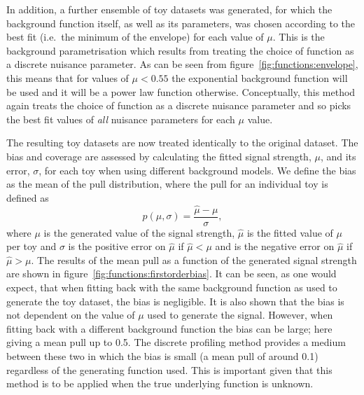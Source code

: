 In addition, a further ensemble of toy datasets was generated, for which the background function itself, as well
as its parameters, was chosen according to the best fit (i.e.~the minimum of the envelope) for each value of $\mu$. This is the background parametrisation which results from treating the choice of function as a discrete nuisance parameter. As can be seen from
figure~\ref{fig:functions:envelope}, this means that for values of $\mu < 0.55$ the exponential background
function will be used and it will be a power law function otherwise.
Conceptually, this method again
treats the choice of function as a discrete nuisance parameter and so picks the
best fit values of {\em all\/} nuisance parameters for each $\mu$ value.

The resulting toy datasets are now treated identically to the original dataset. The bias and coverage are assessed by calculating the fitted signal strength, $\mu$, and its error, $\sigma$, for each toy when using different background models. We define the bias as the mean of the pull distribution, where the pull for an individual toy is defined as
\begin{equation}
	p(\mu,\sigma) = \frac{\hat{\mu}-\mu}{\sigma},
\end{equation}
where $\mu$ is the generated value of the signal strength, $\hat{\mu}$ is the fitted value of $\mu$ per toy and $\sigma$ is the positive error on $\hat{\mu}$ if $\hat{\mu} < \mu$ and is the negative error on $\hat{\mu}$ if $\hat{\mu} > \mu$. The results of the mean pull as a function of the generated signal strength are shown in figure~\ref{fig:functions:firstorderbias}. It can be seen, as one would expect, that when fitting back with the same background function as used to generate the toy dataset, the bias is negligible. It is also shown that the bias is not dependent on the value of $\mu$ used to generate the signal. However, when fitting back with a different background function the bias can be large; here giving a mean pull up to 0.5.
The discrete profiling method provides a medium between these two in which the bias is small (a mean pull of around 0.1) regardless of the generating function used. This is important given that this method is to be applied when the true underlying function is unknown.

